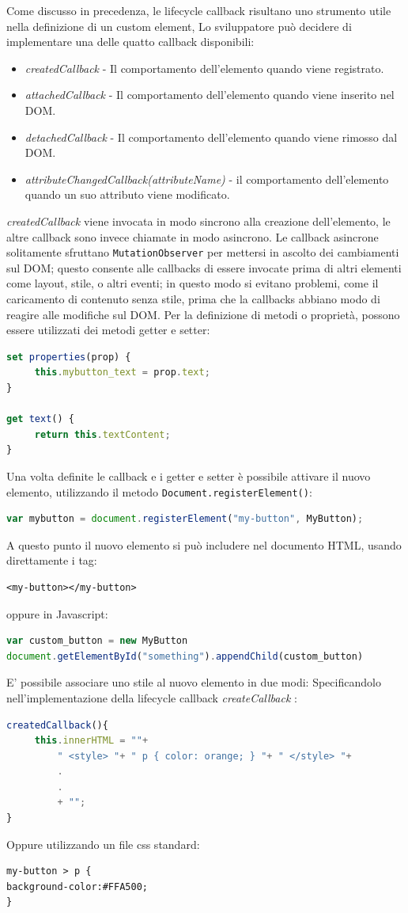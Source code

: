 Come discusso in precedenza, le lifecycle callback risultano uno strumento utile nella definizione di un custom element, Lo sviluppatore può decidere di implementare una delle quatto callback disponibili:
\begin{itemize}
\item \emph {createdCallback} - Il comportamento dell’elemento quando viene registrato.
\item \emph {attachedCallback} - Il comportamento dell’elemento quando viene inserito nel DOM.
\item \emph {detachedCallback} - Il comportamento dell’elemento quando viene rimosso dal DOM.
\item \emph {attributeChangedCallback(attributeName)} - il comportamento dell’elemento quando un suo attributo viene modificato.
\end{itemize}
\emph{createdCallback} viene invocata in modo sincrono alla creazione dell’elemento, le altre callback sono invece chiamate in modo asincrono. Le callback asincrone solitamente sfruttano \texttt{MutationObserver} per mettersi in ascolto dei cambiamenti sul DOM; questo consente alle callbacks di essere invocate prima di altri elementi come layout, stile, o altri eventi; in questo modo si evitano problemi, come il caricamento di contenuto senza stile, prima che la callbacks abbiano modo di reagire alle modifiche sul DOM.
Per la definizione di metodi o proprietà, possono essere utilizzati dei metodi getter e setter:
\begin{lstlisting}[language=JavaScript]
set properties(prop) {
     this.mybutton_text = prop.text;
}

get text() {
     return this.textContent;
}
\end{lstlisting}
Una volta definite le callback e i getter e setter è possibile attivare il nuovo elemento, utilizzando il metodo \texttt{Document.registerElement()}:
\begin{lstlisting}[language=JavaScript]
var mybutton = document.registerElement("my-button", MyButton);
\end{lstlisting}
A questo punto il nuovo elemento si può includere nel documento HTML, usando direttamente i tag:
\begin{lstlisting}[language=HTML5]
<my-button></my-button>
\end{lstlisting}
oppure in Javascript:
\begin{lstlisting}[language=JavaScript]
var custom_button = new MyButton
document.getElementById("something").appendChild(custom_button)
\end{lstlisting}
E’ possibile associare uno stile al nuovo elemento in due modi:
Specificandolo nell’implementazione della lifecycle callback \emph{createCallback} :
\begin{lstlisting}[language=JavaScript]
createdCallback(){ 
     this.innerHTML = ""+ 
         " <style> "+ " p { color: orange; } "+ " </style> "+ 
         .
         .
         + "";
}
\end{lstlisting}
Oppure utilizzando un file css standard:
\begin{lstlisting}[language=HTML5]
my-button > p { 
background-color:#FFA500;
}
\end{lstlisting}

